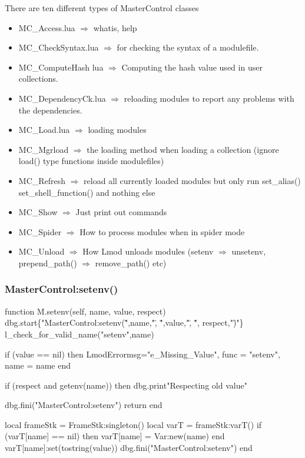 \documentclass{beamer}
\begin{document}
\begin{frame}{There are ten different types of MasterControl classes}
  \begin{itemize}
    \item MC\_Access.lua $\Rightarrow$ whatis, help
    \item MC\_CheckSyntax.lua  $\Rightarrow$ for checking the syntax of a modulefile.
    \item MC\_ComputeHash lua $\Rightarrow$ Computing the hash value used in user collections.
    \item MC\_DependencyCk.lua  $\Rightarrow$ reloading modules to report any problems with the dependencies.
    \item MC\_Load.lua $\Rightarrow$ loading modules
    \item MC\_Mgrload $\Rightarrow$ the loading method when loading a collection (ignore load() type functions inside modulefiles)
    \item MC\_Refresh $\Rightarrow$ reload all currently loaded modules but only run set\_alias() set\_shell\_function() and nothing else   
    \item MC\_Show  $\Rightarrow$ Just print out commands
    \item MC\_Spider  $\Rightarrow$ How to process modules when in spider mode
    \item MC\_Unload  $\Rightarrow$ How Lmod unloads modules (setenv $\Rightarrow$ unsetenv, prepend\_path() $\Rightarrow$ remove\_path() etc)
  \end{itemize}
\end{frame}

\begin{frame}[fragile]
    \frametitle{MasterControl:setenv()}
 {\tiny
    \begin{semiverbatim}
function M.setenv(self, name, value, respect)
   dbg.start\{"MasterControl:setenv(\"",name,"\", \"",value,"\", \"",
              respect,"\")"\}
   l_check_for_valid_name("setenv",name)

   if (value == nil) then
      LmodError{msg="e_Missing_Value", func = "setenv", name = name}
   end

   if (respect and getenv(name)) then
      dbg.print{"Respecting old value"}

      dbg.fini("MasterControl:setenv")
      return
   end

   local frameStk = FrameStk:singleton()
   local varT     = frameStk:varT()
   if (varT[name] == nil) then
      varT[name] = Var:new(name)
   end
   varT[name]:set(tostring(value))
   dbg.fini("MasterControl:setenv")
end
    \end{semiverbatim}
}
\end{frame}
\end{document}
